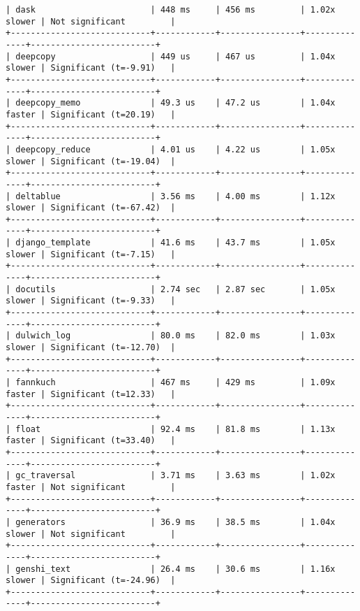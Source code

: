 \begin{code}
\begin{verbatim}
| dask                       | 448 ms     | 456 ms         | 1.02x slower | Not significant         |
+----------------------------+------------+----------------+--------------+-------------------------+
| deepcopy                   | 449 us     | 467 us         | 1.04x slower | Significant (t=-9.91)   |
+----------------------------+------------+----------------+--------------+-------------------------+
| deepcopy_memo              | 49.3 us    | 47.2 us        | 1.04x faster | Significant (t=20.19)   |
+----------------------------+------------+----------------+--------------+-------------------------+
| deepcopy_reduce            | 4.01 us    | 4.22 us        | 1.05x slower | Significant (t=-19.04)  |
+----------------------------+------------+----------------+--------------+-------------------------+
| deltablue                  | 3.56 ms    | 4.00 ms        | 1.12x slower | Significant (t=-67.42)  |
+----------------------------+------------+----------------+--------------+-------------------------+
| django_template            | 41.6 ms    | 43.7 ms        | 1.05x slower | Significant (t=-7.15)   |
+----------------------------+------------+----------------+--------------+-------------------------+
| docutils                   | 2.74 sec   | 2.87 sec       | 1.05x slower | Significant (t=-9.33)   |
+----------------------------+------------+----------------+--------------+-------------------------+
| dulwich_log                | 80.0 ms    | 82.0 ms        | 1.03x slower | Significant (t=-12.70)  |
+----------------------------+------------+----------------+--------------+-------------------------+
| fannkuch                   | 467 ms     | 429 ms         | 1.09x faster | Significant (t=12.33)   |
+----------------------------+------------+----------------+--------------+-------------------------+
| float                      | 92.4 ms    | 81.8 ms        | 1.13x faster | Significant (t=33.40)   |
+----------------------------+------------+----------------+--------------+-------------------------+
| gc_traversal               | 3.71 ms    | 3.63 ms        | 1.02x faster | Not significant         |
+----------------------------+------------+----------------+--------------+-------------------------+
| generators                 | 36.9 ms    | 38.5 ms        | 1.04x slower | Not significant         |
+----------------------------+------------+----------------+--------------+-------------------------+
| genshi_text                | 26.4 ms    | 30.6 ms        | 1.16x slower | Significant (t=-24.96)  |
+----------------------------+------------+----------------+--------------+-------------------------+

\end{verbatim}
\end{code}
